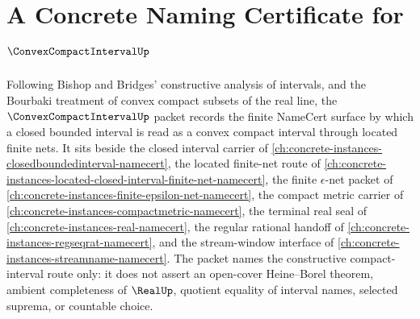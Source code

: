 \chapter{A Concrete Naming Certificate for $\ConvexCompactIntervalUp$}
\label{ch:concrete-instances-convex-compact-interval-namecert}

Following Bishop and Bridges' constructive analysis of intervals, and the Bourbaki treatment of convex compact subsets of the real line, the $\ConvexCompactIntervalUp$ packet records the finite NameCert surface by which a closed bounded interval is read as a convex compact interval through located finite nets. It sits beside the closed interval carrier of \autoref{ch:concrete-instances-closedboundedinterval-namecert}, the located finite-net route of \autoref{ch:concrete-instances-located-closed-interval-finite-net-namecert}, the finite $\epsilon$-net packet of \autoref{ch:concrete-instances-finite-epsilon-net-namecert}, the compact metric carrier of \autoref{ch:concrete-instances-compactmetric-namecert}, the terminal real seal of \autoref{ch:concrete-instances-real-namecert}, the regular rational handoff of \autoref{ch:concrete-instances-regseqrat-namecert}, and the stream-window interface of \autoref{ch:concrete-instances-streamname-namecert}. The packet names the constructive compact-interval route only: it does not assert an open-cover Heine--Borel theorem, ambient completeness of $\RealUp$, quotient equality of interval names, selected suprema, or countable choice.

